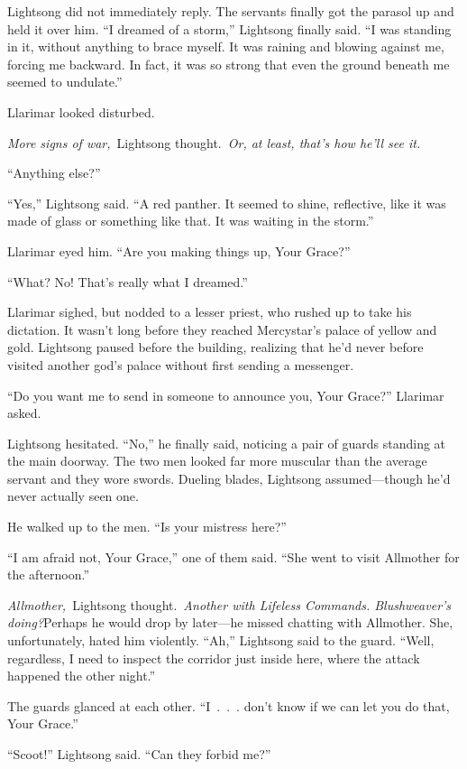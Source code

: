 Lightsong did not immediately reply. The servants finally got the parasol up and held it over him. “I dreamed of a storm,” Lightsong finally said. “I was standing in it, without anything to brace myself. It was raining and blowing against me, forcing me backward. In fact, it was so strong that even the ground beneath me seemed to undulate.”

Llarimar looked disturbed.

\textit{More signs of war,}~Lightsong thought.~\textit{Or, at least, that’s how he’ll see it.}

“Anything else?”

“Yes,” Lightsong said. “A red panther. It seemed to shine, reflective, like it was made of glass or something like that. It was waiting in the storm.”

Llarimar eyed him. “Are you making things up, Your Grace?”

“What? No! That’s really what I dreamed.”

Llarimar sighed, but nodded to a lesser priest, who rushed up to take his dictation. It wasn’t long before they reached Mercystar’s palace of yellow and gold. Lightsong paused before the building, realizing that he’d never before visited another god’s palace without first sending a messenger.

“Do you want me to send in someone to announce you, Your Grace?” Llarimar asked.

Lightsong hesitated. “No,” he finally said, noticing a pair of guards standing at the main doorway. The two men looked far more muscular than the average servant and they wore swords. Dueling blades, Lightsong assumed—though he’d never actually seen one.

He walked up to the men. “Is your mistress here?”

“I am afraid not, Your Grace,” one of them said. “She went to visit Allmother for the afternoon.”

\textit{Allmother,}~Lightsong thought.~\textit{Another with Lifeless Commands. Blushweaver’s doing?}Perhaps he would drop by later—he missed chatting with Allmother. She, unfortunately, hated him violently. “Ah,” Lightsong said to the guard. “Well, regardless, I need to inspect the corridor just inside here, where the attack happened the other night.”

The guards glanced at each other. “I~.~.~. don’t know if we can let you do that, Your Grace.”

“Scoot!” Lightsong said. “Can they forbid me?”

